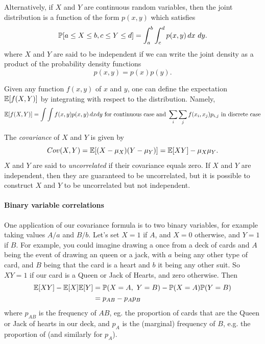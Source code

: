 Alternatively, if $X$ and $Y$ are continuous random variables, then the joint distribution is a function of the form $p(x,y)$ which satisfies 
\begin{equation}
\P[a\le X\le b, c\le Y\le d]= \int_a^b \int_c^d p(x,y)\,dx~dy. 
\end{equation}
where $X$ and $Y$ are said to be independent if we can write the
joint density as a product of the probability density functions 
\begin{equation}
p(x,y) = p(x) p(y).
\end{equation}

Given any function $f(x,y)$ of $x$ and $y$, one can define the expectation $\E[f(X,Y)]$ by integrating with respect to the distribution. Namely, 
\begin{equation}
\E[f(X,Y)]=\int \int f(x,y)p(x,y)\,dxdy \mbox{ for continuous case and } \sum_i \sum_j f(x_i,x_j) p_{i,j} \mbox{ in discrete case}
\end{equation}

The \emph{covariance} of  $X$ and $Y$ is given by 
\begin{equation}
Cov(X,Y) = \E[(X-\mu_X)(Y-\mu_Y)]=\E[XY]-\mu_X\mu_Y. \label{eqn:def_covar}
\end{equation}
$X$ and $Y$ are said to \emph{uncorrelated} if their covariance equals
zero. If $X$ and $Y$ are independent, then they are guaranteed to be
uncorrelated, but it is possible to construct $X$ and $Y$ to be
uncorrelated but not independent. 


\paragraph{Binary variable correlations}
One application of our covariance formula is to two binary variables,
for example taking values $A/a$ and $B/b$. Let's set $X=1$ if $A$, and
$X=0$ otherwise, and $Y=1$ if $B$.  For example, you could imagine drawing
a once from a deck of cards and $A$ being the event of drawing an
queen or a jack, with $a$ being any other type of card, and $B$ being that the card is
a heart and $b$ it being any other suit. So $XY=1$ if our card is a
Queen or Jack of Hearts, and zero otherwise. Then
\begin{align}
  \E[XY] - \E[X]\E[Y] &= \P(X=A,~Y=B) -  \P(X=A) \P(Y=B) \nonumber\\
                        & = p_{AB} - p_{A} p_{B} \label{eqn:binary_covar}
 \end{align}
where $p_{AB}$ is the frequency of $AB$, eg. the proportion of cards
that are the Queen or Jack of hearts in our deck, and $p_{A}$ is the
(marginal) frequency of $B$, e.g. the proportion of 
(and similarly for $p_{A}$).


